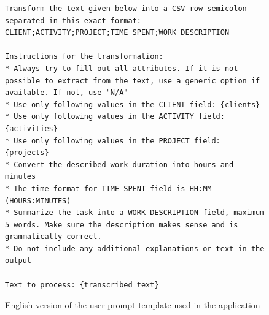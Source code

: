 \documentclass[
  digital,     %
  oneside,     %
  nosansbold,  %
  nocolorbold, %
  lof,         %
  lot,         %
]{fithesis4}
\begin{document}
\begin{figure}[H]
\centering
\begin{minipage}{\textwidth}
\begin{lstlisting}
Transform the text given below into a CSV row semicolon separated in this exact format: CLIENT;ACTIVITY;PROJECT;TIME SPENT;WORK DESCRIPTION

Instructions for the transformation:
* Always try to fill out all attributes. If it is not possible to extract from the text, use a generic option if available. If not, use "N/A"
* Use only following values in the CLIENT field: {clients}
* Use only following values in the ACTIVITY field: {activities}
* Use only following values in the PROJECT field: {projects}
* Convert the described work duration into hours and minutes
* The time format for TIME SPENT field is HH:MM (HOURS:MINUTES)
* Summarize the task into a WORK DESCRIPTION field, maximum 5 words. Make sure the description makes sense and is grammatically correct.
* Do not include any additional explanations or text in the output

Text to process: {transcribed_text}
\end{lstlisting}
\caption{English version of the user prompt template used in the application}
\label{fig:user_prompt_template_en}
\end{minipage}
\end{figure}
\end{document}
